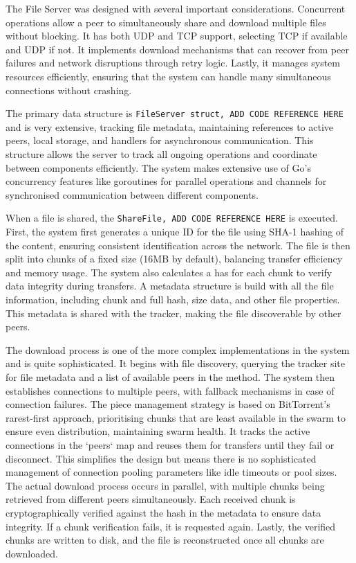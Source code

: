 \documentclass[12pt,a4paper]{report}
\begin{document}
The File Server was designed with several important considerations. Concurrent operations allow a peer to simultaneously share and download multiple files without blocking. It has both UDP and TCP support, selecting TCP if available and UDP if not. It implements download mechanisms that can recover from peer failures and network disruptions through retry logic. Lastly, it manages system resources efficiently, ensuring that the system can handle many simultaneous connections without crashing.

The primary data structure is \texttt{FileServer struct, ADD CODE REFERENCE HERE} and is very extensive, tracking file metadata, maintaining references to active peers, local storage, and handlers for asynchronous communication. This structure allows the server to track all ongoing operations and coordinate between components efficiently. The system makes extensive use of Go's concurrency features like goroutines for parallel operations and channels for synchronised communication between different components.

When a file is shared, the \texttt{ShareFile, ADD CODE REFERENCE HERE} is executed. First, the system first generates a unique ID for the file using SHA-1 hashing of the content, ensuring consistent identification across the network. The file is then split into chunks of a fixed size (16MB by default), balancing transfer efficiency and memory usage. The system also calculates a has for each chunk to verify data integrity during transfers. A metadata structure is build with all the file information, including chunk and full hash, size data, and other file properties. This metadata is shared with the tracker, making the file discoverable by other peers.

The download process is one of the more complex implementations in the system and is quite sophisticated. It begins with file discovery, querying the tracker site for file metadata and a list of available peers in the  method. The system then establishes connections to multiple peers, with fallback mechanisms in case of connection failures. The piece management strategy is based on BitTorrent's rarest-first approach, prioritising chunks that are least available in the swarm to ensure even distribution, maintaining swarm health. It tracks the active connections in the `peers` map and reuses them for transfers until they fail or disconnect. This simplifies the design but means there is no sophisticated management of connection pooling parameters like idle timeouts or pool sizes. The actual download process occurs in parallel, with multiple chunks being retrieved from different peers simultaneously. Each received chunk is cryptographically verified against the hash in the metadata to ensure data integrity. If a chunk verification fails, it is requested again. Lastly, the verified chunks are written to disk, and the file is reconstructed once all chunks are downloaded.
\end{document}
